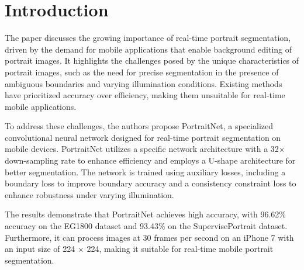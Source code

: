 \section{Introduction}
The paper discusses the growing importance of real-time portrait segmentation, driven by the demand for mobile applications that enable background editing of portrait images. It highlights the challenges posed by the unique characteristics of portrait images, such as the need for precise segmentation in the presence of ambiguous boundaries and varying illumination conditions. Existing methods have prioritized accuracy over efficiency, making them unsuitable for real-time mobile applications.

To address these challenges, the authors propose PortraitNet, a specialized convolutional neural network designed for real-time portrait segmentation on mobile devices. PortraitNet utilizes a specific network architecture with a 32× down-sampling rate to enhance efficiency and employs a U-shape architecture for better segmentation. The network is trained using auxiliary losses, including a boundary loss to improve boundary accuracy and a consistency constraint loss to enhance robustness under varying illumination.

The results demonstrate that PortraitNet achieves high accuracy, with 96.62\% accuracy on the EG1800 dataset and 93.43\% on the SupervisePortrait dataset. Furthermore, it can process images at 30 frames per second on an iPhone 7 with an input size of 224 × 224, making it suitable for real-time mobile portrait segmentation.

